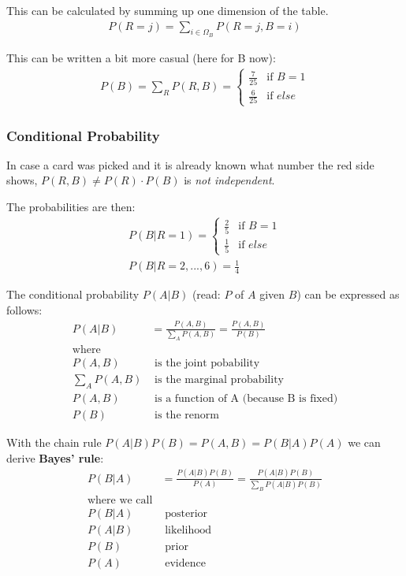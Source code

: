 This can be calculated by summing up one dimension of the table.
\begin{align*}
P(R=j) = \sum\limits_{i \in \Omega_B} P(R=j, B=i)
\end{align*}

This can be written a bit more casual (here for B now):
\begin{align*}
P(B) = \sum\limits_R P(R, B) = 
\begin{cases} 
\frac{7}{25} & \mbox{if } B = 1 \\ 
\frac{6}{25} & \mbox{if } else
\end{cases}
\end{align*}

\subsubsection*{Conditional Probability}
In case a card was picked and it is already known what number the red side shows,
$P(R, B) \neq P(R) \cdot P(B)$ is \textit{not independent}.

The probabilities are then:
\begin{align*}
P(B|R=1) =
\begin{cases} 
\frac{2}{5} & \mbox{if } B = 1 \\ 
\frac{1}{5} & \mbox{if } else
\end{cases}\\
P(B|R=2, ..., 6) = \frac{1}{4}
\end{align*}

The conditional probability $P(A|B)$ (read: $P$ of $A$ given $B$) can be expressed as follows:
\begin{align*}
P(A|B)         &= \frac{P(A, B)}{\sum\limits_A P(A, B)} = \frac{P(A, B)}{P(B)} \\
\mbox{where}   & \\
P(A, B)        &\mbox{ is the joint pobability} \\
\sum\limits_A P(A, B) &\mbox{ is the marginal probability} \\
P(A, B)        &\mbox{ is a function of A (because B is fixed)}\\
P(B)           &\mbox{ is the renorm}
\end{align*}

With the chain rule $P(A|B)P(B) = P(A, B) = P(B|A)P(A)$ we can derive \textbf{Bayes' rule}:
\begin{align*}
P(B|A) &= \frac{P(A|B)P(B)}{P(A)} = \frac{P(A|B)P(B)}{\sum\limits_B P(A|B)P(B)} \\
\mbox{where we call}   & \\
P(B|A)  &\mbox{ posterior} \\
P(A|B)  &\mbox{ likelihood} \\
P(B)    &\mbox{ prior} \\
P(A)    &\mbox{ evidence}
\end{align*}




